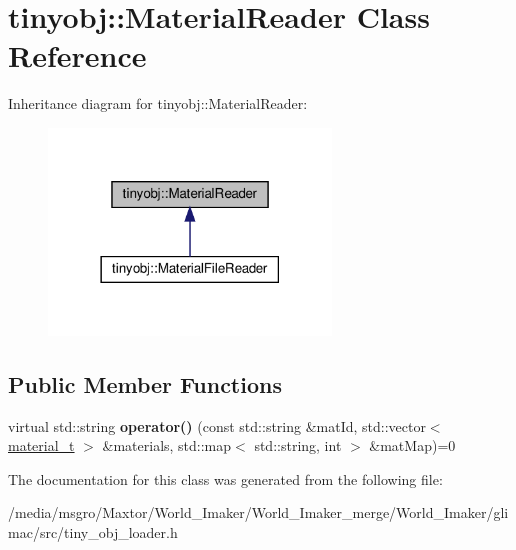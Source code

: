 \hypertarget{classtinyobj_1_1MaterialReader}{}\section{tinyobj\+:\+:Material\+Reader Class Reference}
\label{classtinyobj_1_1MaterialReader}


Inheritance diagram for tinyobj\+:\+:Material\+Reader\+:
\nopagebreak
\begin{figure}[H]
\begin{center}
\leavevmode
\includegraphics[width=213pt]{classtinyobj_1_1MaterialReader__inherit__graph}
\end{center}
\end{figure}
\subsection*{Public Member Functions}
\begin{DoxyCompactItemize}
\item 
\mbox{\label{classtinyobj_1_1MaterialReader_afc27ac917abd33dc3ec4a9ae7a519962}} 
virtual std\+::string {\bfseries operator()} (const std\+::string \&mat\+Id, std\+::vector$<$ \hyperlink{structtinyobj_1_1material__t}{material\+\_\+t} $>$ \&materials, std\+::map$<$ std\+::string, int $>$ \&mat\+Map)=0
\end{DoxyCompactItemize}


The documentation for this class was generated from the following file\+:\begin{DoxyCompactItemize}
\item 
/media/msgro/\+Maxtor/\+World\+\_\+\+Imaker/\+World\+\_\+\+Imaker\+\_\+merge/\+World\+\_\+\+Imaker/glimac/src/tiny\+\_\+obj\+\_\+loader.\+h\end{DoxyCompactItemize}
